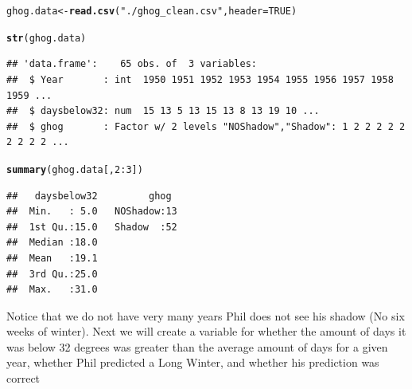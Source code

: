 \documentclass[12pt]{article}\usepackage[]{graphicx}\usepackage[]{color}
\makeatletter
\newcommand{\hlnum}[1]{\textcolor[rgb]{0.686,0.059,0.569}{#1}}%
\newcommand{\hlstr}[1]{\textcolor[rgb]{0.192,0.494,0.8}{#1}}%
\newcommand{\hlopt}[1]{\textcolor[rgb]{0,0,0}{#1}}%
\newcommand{\hlstd}[1]{\textcolor[rgb]{0.345,0.345,0.345}{#1}}%
\newcommand{\hlkwb}[1]{\textcolor[rgb]{0.69,0.353,0.396}{#1}}%
\newcommand{\hlkwc}[1]{\textcolor[rgb]{0.333,0.667,0.333}{#1}}%
\newcommand{\hlkwd}[1]{\textcolor[rgb]{0.737,0.353,0.396}{\textbf{#1}}}%
\newenvironment{kframe}{%
 \def\at@end@of@kframe{}%
 \ifinner\ifhmode%
  \def\at@end@of@kframe{\end{minipage}}%
  \begin{minipage}{\columnwidth}%
 \fi\fi%
 \def\FrameCommand##1{\hskip\@totalleftmargin \hskip-\fboxsep
 \colorbox{shadecolor}{##1}\hskip-\fboxsep
     \hskip-\linewidth \hskip-\@totalleftmargin \hskip\columnwidth}%
 \MakeFramed {\advance\hsize-\width
   \@totalleftmargin\z@ \linewidth\hsize
   \@setminipage}}%
 {\par\unskip\endMakeFramed%
 \at@end@of@kframe}
\newenvironment{knitrout}{}{} %
\makeatother
\begin{document}
\begin{knitrout}
\color{fgcolor}\begin{kframe}
\begin{alltt}
\hlstd{ghog.data}\hlkwb{<-}\hlkwd{read.csv}\hlstd{(}\hlstr{"./ghog_clean.csv"}\hlstd{,}\hlkwc{header}\hlstd{=}\hlnum{TRUE}\hlstd{)}

\hlkwd{str}\hlstd{(ghog.data)}
\end{alltt}
\begin{verbatim}
## 'data.frame':	65 obs. of  3 variables:
##  $ Year       : int  1950 1951 1952 1953 1954 1955 1956 1957 1958 1959 ...
##  $ daysbelow32: num  15 13 5 13 15 13 8 13 19 10 ...
##  $ ghog       : Factor w/ 2 levels "NOShadow","Shadow": 1 2 2 2 2 2 2 2 2 2 ...
\end{verbatim}
\begin{alltt}
\hlkwd{summary}\hlstd{(ghog.data[,}\hlnum{2}\hlopt{:}\hlnum{3}\hlstd{])}
\end{alltt}
\begin{verbatim}
##   daysbelow32         ghog   
##  Min.   : 5.0   NOShadow:13  
##  1st Qu.:15.0   Shadow  :52  
##  Median :18.0                
##  Mean   :19.1                
##  3rd Qu.:25.0                
##  Max.   :31.0
\end{verbatim}
\end{kframe}
\end{knitrout}
 
 Notice that we do not have very many years Phil does not see his shadow (No six weeks of winter). Next we will create a variable for whether the amount of days it was below 32 degrees was greater than the average amount of days for a given year, whether Phil predicted a Long Winter, and whether his prediction was correct
 
\end{document}
